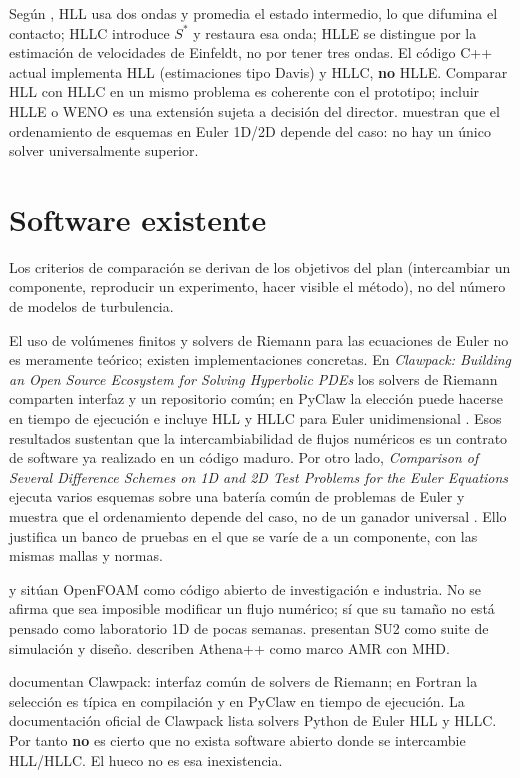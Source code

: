 Según \textcite{toro2009}, HLL usa dos ondas y promedia el estado intermedio, lo que difumina el contacto; HLLC introduce $S^{*}$ y restaura esa onda; HLLE se distingue por la estimación de velocidades de Einfeldt, no por tener tres ondas. El código C++ actual implementa HLL (estimaciones tipo Davis) y HLLC, \textbf{no} HLLE. Comparar HLL con HLLC en un mismo problema es coherente con el prototipo; incluir HLLE o WENO es una extensión sujeta a decisión del director. \textcite{liska2003} muestran que el ordenamiento de esquemas en Euler 1D/2D depende del caso: no hay un único solver universalmente superior.

\section{Software existente}

Los criterios de comparación se derivan de los objetivos del plan (intercambiar un componente, reproducir un experimento, hacer visible el método), no del número de modelos de turbulencia.

El uso de volúmenes finitos y solvers de Riemann para las ecuaciones de Euler no es meramente teórico; existen implementaciones concretas. En \textit{Clawpack: Building an Open Source Ecosystem for Solving Hyperbolic PDEs} los solvers de Riemann comparten interfaz y un repositorio común; en PyClaw la elección puede hacerse en tiempo de ejecución e incluye HLL y HLLC para Euler unidimensional \parencite{mandli2016}. Esos resultados sustentan que la intercambiabilidad de flujos numéricos es un contrato de software ya realizado en un código maduro. Por otro lado, \textit{Comparison of Several Difference Schemes on 1D and 2D Test Problems for the Euler Equations} ejecuta varios esquemas sobre una batería común de problemas de Euler y muestra que el ordenamiento depende del caso, no de un ganador universal \parencite{liska2003}. Ello justifica un banco de pruebas en el que se varíe de a un componente, con las mismas mallas y normas.

\textcite{weller1998} y \textcite{jasak2009} sitúan OpenFOAM como código abierto de investigación e industria. No se afirma que sea imposible modificar un flujo numérico; sí que su tamaño no está pensado como laboratorio 1D de pocas semanas. \textcite{economon2016} presentan SU2 como suite de simulación y diseño. \textcite{stone2020} describen Athena++ como marco AMR con MHD.

\textcite{mandli2016} documentan Clawpack: interfaz común de solvers de Riemann; en Fortran la selección es típica en compilación y en PyClaw en tiempo de ejecución. La documentación oficial de Clawpack lista solvers Python de Euler HLL y HLLC. Por tanto \textbf{no} es cierto que no exista software abierto donde se intercambie HLL/HLLC. El hueco no es esa inexistencia.

